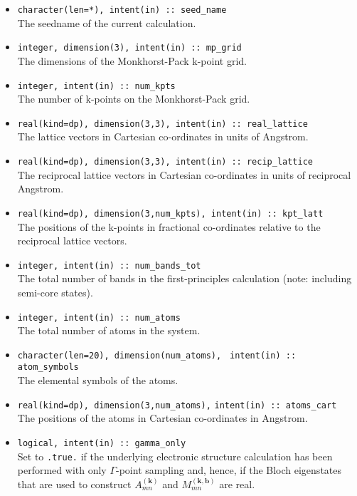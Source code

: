 \begin{itemize}
\item \verb#character(len=*), intent(in) :: seed_name#\\ The seedname
  of the current calculation.
\item \verb#integer, dimension(3), intent(in) :: mp_grid#\\ The
  dimensions of the {Monkhorst-Pack} k-point grid.
\item \verb#integer, intent(in) :: num_kpts#\\ The number of k-points on
  the {Monkhorst-Pack} grid.
\item \verb#real(kind=dp), dimension(3,3), intent(in) :: real_lattice#\\
  The lattice vectors in Cartesian co-ordinates in units of Angstrom.
\item \verb#real(kind=dp), dimension(3,3), intent(in) :: recip_lattice#\\
  The reciprocal lattice vectors in Cartesian co-ordinates in units of reciprocal Angstrom.
\item
  \verb#real(kind=dp), dimension(3,num_kpts), intent(in) :: kpt_latt#\\
  The positions of the k-points in fractional co-ordinates
  relative to the reciprocal lattice vectors.
\item \verb#integer, intent(in) :: num_bands_tot#\\ The total number of bands in the
first-principles calculation (note: including semi-core states).
\item \verb#integer, intent(in) :: num_atoms#\\ The total number of atoms
  in the system.
\item \verb#character(len=20), dimension(num_atoms),#
      \verb# intent(in) :: atom_symbols#\\ The elemental symbols of
      the atoms.
\item \verb#real(kind=dp), dimension(3,num_atoms),#
      \verb#intent(in) :: atoms_cart#\\ The positions of the atoms in
      Cartesian co-ordinates in Angstrom.
\item \verb#logical, intent(in) :: gamma_only#\\ Set to \texttt{.true.} if the
  underlying electronic structure calculation has been performed with
  only $\Gamma$-point sampling and, hence, if the Bloch eigenstates
  that are used to construct $A_{mn}^{(\mathbf{k})}$ and
  $M_{mn}^{\mathbf{(k,b)}}$ are real.

\end{itemize}
